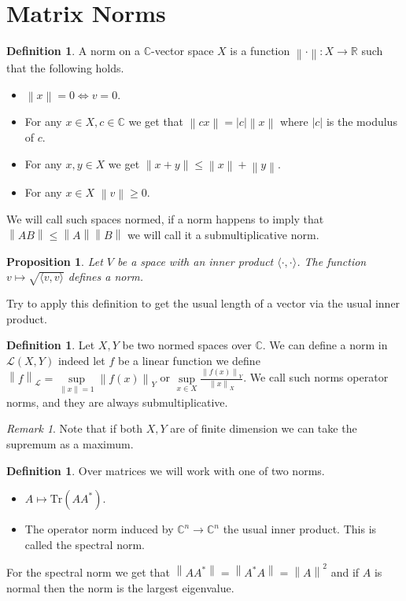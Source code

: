 \documentclass[12pt]{article}
\newcommand{\norm}[1]{\left\lVert #1 \right\rVert}
\newtheorem{prop}[theorem]{Proposition}
\theoremstyle{definition}
\newtheorem{definition}[theorem]{Definition}
\theoremstyle{remark}
\newtheorem*{remark}{Remark}
\theoremstyle{plain}
\begin{document}
\section{Matrix Norms}
\begin{definition}
    A norm on a $\mathbb{C}$-vector space $X$ is a function $\norm{\cdot} : X\to \mathbb{R}$ such that the following holds.
    \begin{itemize}
        \item $\norm{x}=0\iff v=0$.
        \item For any $x\in X,c\in \mathbb{C}$ we get that $\norm{cx}=|c|\norm{x}$ where $|c|$ is the modulus of $c$.
        \item For any $x,y\in X$ we get $\norm{x+y}\leq \norm{x}+\norm{y}$.
        \item For any $x\in X$ $\norm{v}\geq 0$.
    \end{itemize}
    We will call such spaces normed, if a norm happens to imply that $\norm{AB}\leq \norm{A}\norm{B}$ we will call it a submultiplicative norm.
\end{definition}
\begin{prop}
    Let $V$ be a space with an inner product $\langle\cdot,\cdot\rangle$. The function $v\mapsto \sqrt{\langle v,v \rangle}$ defines a norm.
\end{prop}
Try to apply this definition to get the usual length of a vector via the usual inner product.
\begin{definition}
    Let $X,Y$ be two normed spaces over $\mathbb{C}$.
    We can define a norm in $\mathcal{L}(X,Y)$ indeed let $f$ be a linear function we define $\norm{f}_{\mathcal{L}}=\sup\limits_{\norm{x}=1}\norm{f(x)}_Y$ or $\sup\limits_{x\in X} \frac{\norm{f(x)}_Y}{\norm{x}_X}$. We call such norms operator norms, and they are always submultiplicative.
\end{definition}
\begin{remark}
    Note that if both $X,Y$ are of finite dimension we can take the supremum as a maximum.
\end{remark}
\begin{definition}
    Over matrices we will work with one of two norms.\begin{itemize}
        \item $A\mapsto \mathrm{Tr}(AA^*)$.
        \item The operator norm induced by $\mathbb{C}^n\to \mathbb{C}^n$ the usual inner product. This is called the spectral norm. 
    \end{itemize} 
For the spectral norm we get that $\norm{AA^*}=\norm{A^*A}=\norm{A}^2$ and if $A$ is normal then the norm is the largest eigenvalue.
\end{definition}
\end{document}
